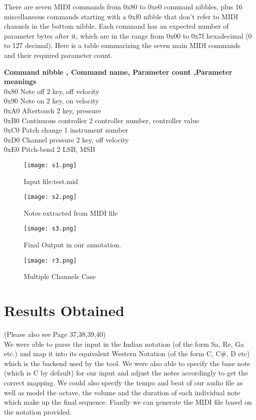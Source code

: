 \documentclass[12pt,a4paper]{article}
\begin{document}
There are seven MIDI commands from 0x80 to 0xe0 command nibbles, plus 16 miscellaneous commands starting with a 0xf0 nibble that don't refer to MIDI channels in the bottom nibble. Each command has an expected number of parameter bytes after it, which are in the range from 0x00 to 0x7f hexadecimal (0 to 127 decimal). Here is a table summarizing the seven main MIDI commands and their required parameter count.

 \textbf{Command nibble ,	Command name,	Parameter count	,Parameter meanings}\\
0x80	Note off	2	key, off velocity\\
0x90	Note on	2	key, on velocity\\
0xA0	Aftertouch	2	key, pressure\\
0xB0	Continuous controller	2	controller number, controller value\\
0xC0	Patch change	1	instrument number\\
0xD0	Channel pressure	2	key, off velocity\\
0xE0	Pitch-bend	2	LSB, MSB\\
 

\pagebreak


\begin{figure}[ht]
\centering
\texttt{[image: s1.png]}
\caption{Input file:test.mid}
\label{fig:beta}
\end{figure}
\pagebreak

\begin{figure}[ht]
\centering
\texttt{[image: s2.png]}
\caption{Notes extracted from MIDI file}
\label{fig:beta}
\end{figure}
\pagebreak


\begin{figure}[ht]
\centering
\texttt{[image: s3.png]}
\caption{Final Output in our annotation.}
\label{fig:beta}
\end{figure}



\begin{figure}[ht]
\centering
\texttt{[image: r3.png]}
\caption{Multiple Channels Case}
\label{fig:beta}
\end{figure}

\pagebreak
\section{ Results Obtained}
(Please also see Page 37,38,39,40)\\
We were able to parse the input in the Indian notation (of the form Sa, Re, Ga etc.) and map it into its equivalent Western Notation (of the form C, C\#, D etc) which is the backend used by the tool. We were also able to specify the base note (which is C by default) for our input and adjust the notes accordingly to get the correct mapping. We could also specify the tempo and beat of our audio file as well as model the octave, the volume and the duration of each individual note which make up the final sequence. Fianlly we can generate the MIDI file based on the notation provided.
\end{document}
